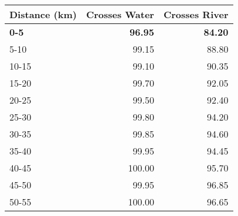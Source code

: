 \begin{tabular}{lrr}
\toprule
Distance (km) & Crosses Water & Crosses River \\
\midrule
\textbf{0-5} & \textbf{96.95} & \textbf{84.20} \\
5-10 & 99.15 & 88.80 \\
10-15 & 99.10 & 90.35 \\
15-20 & 99.70 & 92.05 \\
20-25 & 99.50 & 92.40 \\
25-30 & 99.80 & 94.20 \\
30-35 & 99.85 & 94.60 \\
35-40 & 99.95 & 94.45 \\
40-45 & 100.00 & 95.70 \\
45-50 & 99.95 & 96.85 \\
50-55 & 100.00 & 96.65 \\
\bottomrule
\end{tabular}
